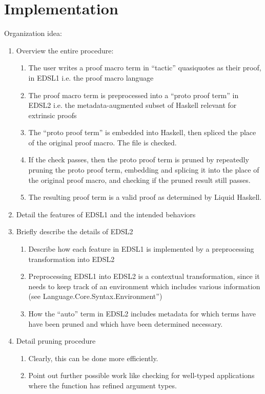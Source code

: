 \section{Implementation}

Organization idea:
\begin{enumerate}
  \item Overview the entire procedure:
  \begin{enumerate}
    \item The user writes a proof macro term in ``tactic'' quasiquotes as their proof, in EDSL1 i.e. the proof macro language
    \item The proof macro term is preprocessed into a ``proto proof term'' in EDSL2 i.e. the metadata-augmented subset of Haskell relevant for extrinsic proofs
    \item The ``proto proof term'' is embedded into Haskell, then spliced the place of the original proof macro. The file is checked.
    \item If the check passes, then the proto proof term is pruned by repeatedly pruning the proto proof term, embedding and splicing it into the place of the original proof macro, and checking if the pruned result still passes.
    \item The resulting proof term is a valid proof as determined by Liquid Haskell.
  \end{enumerate}
  \item Detail the features of EDSL1 and the intended behaviors
  \item Briefly describe the details of EDSL2
  \begin{enumerate}
    \item Describe how each feature in EDSL1 is implemented by a preprocessing transformation into EDSL2
    \item Preprocessing EDSL1 into EDSL2 is a contextual transformation, since it needs to keep track of an environment which includes various information (see Language.Core.Syntax.Environment'')
    \item How the ``auto'' term in EDSL2 includes metadata for which terms have have been pruned and which have been determined necessary.
  \end{enumerate}
  \item Detail pruning procedure
  \begin{enumerate}
    \item Clearly, this can be done more efficiently.
    \item Point out further possible work like checking for well-typed applications where the function has refined argument types.
  \end{enumerate}
\end{enumerate}

